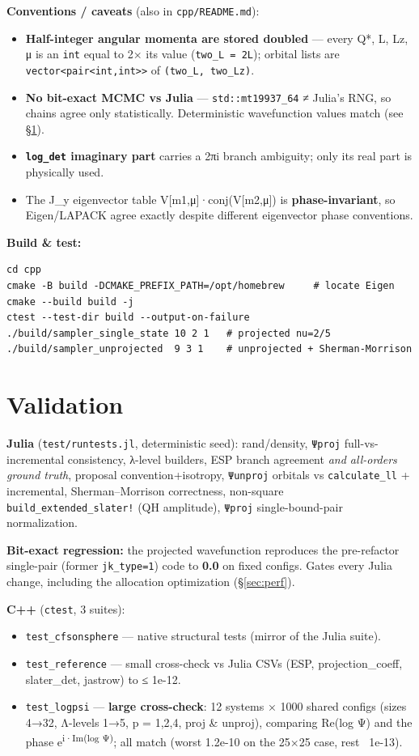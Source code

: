 \documentclass[11pt]{article}
\newcommand{\code}[1]{\texttt{#1}}
\begin{document}
\textbf{Conventions / caveats} (also in \code{cpp/README.md}):
\begin{itemize}
\item \textbf{Half-integer angular momenta are stored doubled} --- every Q*, L, Lz, μ is an
  \code{int} equal to 2× its value (\code{two\_L = 2L}); orbital lists are
  \code{vector<pair<int,int>>} of \code{(two\_L, two\_Lz)}.
\item \textbf{No bit-exact MCMC vs Julia} --- \code{std::mt19937\_64} ≠ Julia's RNG, so chains agree
  only statistically. Deterministic wavefunction values match (see §\ref{sec:val}).
\item \textbf{\code{log\_det} imaginary part} carries a 2πi branch ambiguity; only its real part
  is physically used.
\item The J\_y eigenvector table V[m1,μ]·conj(V[m2,μ]) is \textbf{phase-invariant}, so Eigen/LAPACK
  agree exactly despite different eigenvector phase conventions.
\end{itemize}

\textbf{Build \& test:}
\begin{Verbatim}[fontsize=\small]
cd cpp
cmake -B build -DCMAKE_PREFIX_PATH=/opt/homebrew     # locate Eigen
cmake --build build -j
ctest --test-dir build --output-on-failure
./build/sampler_single_state 10 2 1   # projected nu=2/5
./build/sampler_unprojected  9 3 1    # unprojected + Sherman-Morrison
\end{Verbatim}

\section{Validation}\label{sec:val}

\textbf{Julia} (\code{test/runtests.jl}, deterministic seed): rand/density, \code{Ψproj}
full-vs-incremental consistency, λ-level builders, ESP branch agreement \emph{and all-orders
ground truth}, proposal convention+isotropy, \code{Ψunproj} orbitals vs \code{calculate\_ll} +
incremental, Sherman--Morrison correctness, non-square \code{build\_extended\_slater!} (QH
amplitude), \code{Ψproj} single-bound-pair normalization.

\textbf{Bit-exact regression:} the projected wavefunction reproduces the pre-refactor
single-pair (former \code{jk\_type=1}) code to \textbf{0.0} on fixed configs. Gates every Julia
change, including the allocation optimization (§\ref{sec:perf}).

\textbf{C++} (\code{ctest}, 3 suites):
\begin{itemize}
\item \code{test\_cfsonsphere} --- native structural tests (mirror of the Julia suite).
\item \code{test\_reference} --- small cross-check vs Julia CSVs (ESP, projection\_coeff,
  slater\_det, jastrow) to ≤ 1e-12.
\item \code{test\_logpsi} --- \textbf{large cross-check}: 12 systems × 1000 shared configs (sizes
  4→32, Λ-levels 1→5, p = 1,2,4, proj \& unproj), comparing Re(log Ψ) and the phase
  e\textsuperscript{i·Im(log Ψ)}; all match (worst 1.2e-10 on the 25×25 case, rest ~1e-13).
\end{itemize}
\end{document}
